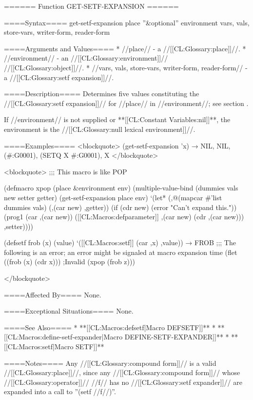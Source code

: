 ====== Function GET-SETF-EXPANSION ======

====Syntax====
\DefunWithValuesNewline get-setf-expansion {place ''&optional'' environment} {vars, vals, store-vars, writer-form, reader-form}

====Arguments and Values====
  * //place// - a //[[CL:Glossary:place]]//.
  * //environment// - an //[[CL:Glossary:environment]]// //[[CL:Glossary:object]]//.
  * //vars, vals, store-vars, writer-form, reader-form// - a //[[CL:Glossary:setf expansion]]//.

====Description====
Determines five values constituting the //[[CL:Glossary:setf expansion]]// for //place// in //environment//; see section {\secref\SetfExpansions}.



If //environment// is not supplied or **[[CL:Constant Variables:nil]]**, the environment is the //[[CL:Glossary:null lexical environment]]//.

====Examples====
<blockquote> (get-setf-expansion 'x) → NIL, NIL, (#:G0001), (SETQ X #:G0001), X </blockquote>

<blockquote> ;;; This macro is like POP

(defmacro xpop (place &environment env) (multiple-value-bind (dummies vals new setter getter) (get-setf-expansion place env) `(let* (,@(mapcar #'list dummies vals) (,(car new) ,getter)) (if (cdr new) (error "Can't expand this.")) (prog1 (car ,(car new)) ([[CL:Macros:defparameter]] ,(car new) (cdr ,(car new))) ,setter))))

(defsetf frob (x) (value) `([[CL:Macros:setf]] (car ,x) ,value)) → FROB ;;; The following is an error; an error might be signaled at macro expansion time (flet ((frob (x) (cdr x))) ;Invalid (xpop (frob z)))

</blockquote>



====Affected By====
None.

====Exceptional Situations====
None.

====See Also====
  * **[[CL:Macros:defsetf|Macro DEFSETF]]**
  * **[[CL:Macros:define-setf-expander|Macro DEFINE-SETF-EXPANDER]]**
  * **[[CL:Macros:setf|Macro SETF]]**

====Notes====
Any //[[CL:Glossary:compound form]]// is a valid //[[CL:Glossary:place]]//, since any //[[CL:Glossary:compound form]]// whose //[[CL:Glossary:operator]]// //f// has no //[[CL:Glossary:setf expander]]// are expanded into a call to ''(setf //f//)''.

    
